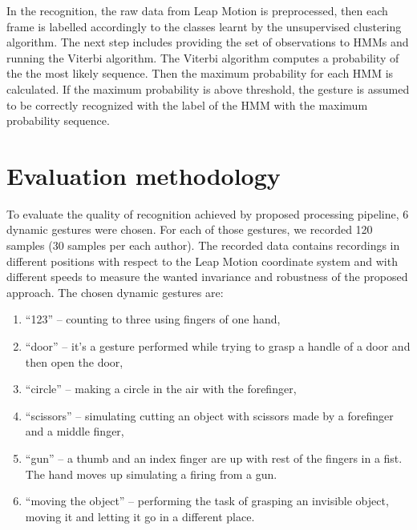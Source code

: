 In the recognition, the raw data from Leap Motion is preprocessed, then each frame is labelled accordingly to the classes learnt by the unsupervised clustering algorithm.
The next step includes providing the set of observations to HMMs and running the Viterbi algorithm.
The Viterbi algorithm computes a probability of the the most likely sequence.
Then the maximum probability for each HMM is calculated.
If the maximum probability is above threshold, the gesture is assumed to be correctly recognized with the label of the HMM with the maximum probability sequence.


\section{Evaluation methodology}\label{dynamic:set}

To evaluate the quality of recognition achieved by proposed processing pipeline, $6$ dynamic gestures were chosen.
For each of those gestures, we recorded 120 samples (30 samples per each author).
The recorded data contains recordings in different positions with respect to the Leap Motion coordinate system and with different speeds to measure the wanted invariance and robustness of the proposed approach.
The chosen dynamic gestures are:
\begin{enumerate}
\item ``123'' -- counting to three using fingers of one hand,
\item ``door'' -- it's a gesture performed while trying to grasp a handle of a door and then open the door,
\item ``circle'' -- making a circle in the air with the forefinger,
\item ``scissors'' -- simulating cutting an object with scissors made by a forefinger and a middle finger,
\item ``gun'' -- a thumb and an index finger are up with rest of the fingers in a fist. The hand moves up simulating a firing from a gun.
\item ``moving the object'' -- performing the task of grasping an invisible object, moving it and letting it go in a different place.
\end{enumerate}

